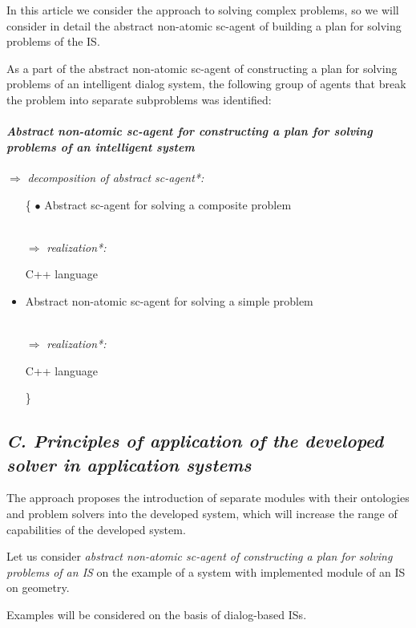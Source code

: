 \documentclass[a4paper, 10pt,]{article}
\begin{document}
In this article we consider the approach to solving complex problems, so we will consider in detail the abstract non-atomic sc-agent of building a plan for solving problems of the IS.

As a part of the abstract non-atomic sc-agent of constructing a plan for solving problems of an intelligent dialog system, the following group of agents that break the problem into separate subproblems was identified:
\paragraph{\textbf{\textit{Abstract non-atomic sc-agent for constructing a plan for solving problems of an intelligent system}}}

\hfill\break${\Rightarrow}$
\textit{decomposition of abstract sc-agent*:}

\begin{itemize}
\item [\{ $\bullet$] Abstract sc-agent for solving a composite problem

\\${\Rightarrow}$ 
\textit{realization*:}

\hspace{0.5cm}C++ language 

\item Abstract non-atomic sc-agent for solving a
simple problem

\\${\Rightarrow}$ 
\textit{realization*:}

\hspace{0.5cm}C++ language 
\item [\}] 
\end{itemize}


\subsection*{\textit{C. Principles of application of the developed solver in application systems}} 
The approach proposes the introduction of separate modules with their ontologies and problem solvers into the developed system, which will increase the range of capabilities of the developed system.

Let us consider \textit{abstract non-atomic sc-agent of constructing a plan for solving problems of an IS} on the example of a system with implemented module of an IS on geometry.

Examples will be considered on the basis of dialog-based ISs.
\end{document}
